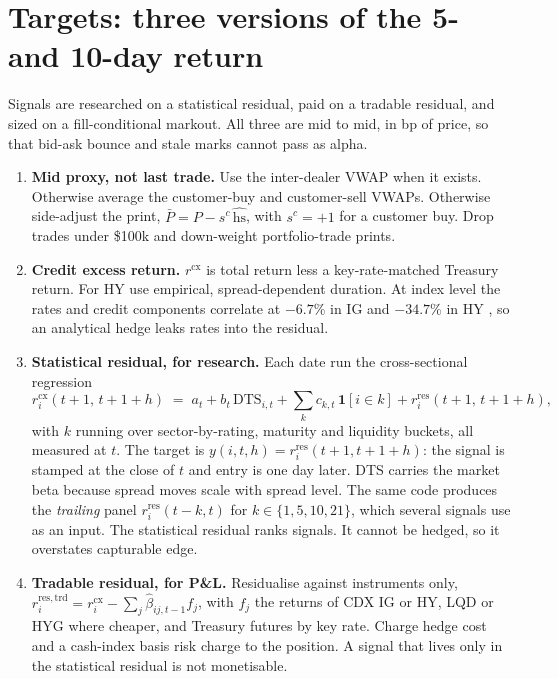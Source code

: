 \documentclass[11pt,letterpaper]{article}
\newcommand{\ind}[1]{\mathbf{1}\!\left[#1\right]}
\newcommand{\Pm}{\bar{P}}                 %
\newcommand{\hs}{\mathrm{hs}}             %
\newcommand{\rres}{r^{\mathrm{res}}}      %
\newcommand{\rcx}{r^{\mathrm{cx}}}        %
\begin{document}
\section{Targets: three versions of the 5- and 10-day return}
\label{sec:targets}

Signals are researched on a statistical residual, paid on a tradable residual, and sized on a fill-conditional markout. All three are mid to mid, in bp of price, so that bid-ask bounce and stale marks cannot pass as alpha.

\begin{enumerate}[itemsep=4pt]
\item \textbf{Mid proxy, not last trade.} Use the inter-dealer VWAP when it exists. Otherwise average the customer-buy and customer-sell VWAPs. Otherwise side-adjust the print, $\Pm = P - s^{c}\,\widehat{\hs}$, with $s^{c}=+1$ for a customer buy. Drop trades under \$100k and down-weight portfolio-trade prints.

\item \textbf{Credit excess return.} $\rcx$ is total return less a key-rate-matched Treasury return. For HY use empirical, spread-dependent duration. At index level the rates and credit components correlate at $-6.7\%$ in IG and $-34.7\%$ in HY \cite{andreani2024}, so an analytical hedge leaks rates into the residual.

\item \textbf{Statistical residual, for research.} Each date run the cross-sectional regression
\begin{equation}
\rcx_i(t+1,\,t+1+h) \;=\; a_t + b_t\,\mathrm{DTS}_{i,t} + \sum_k c_{k,t}\,\ind{i\in k} + \rres_i(t+1,\,t+1+h),
\end{equation}
with $k$ running over sector-by-rating, maturity and liquidity buckets, all measured at $t$. The target is $y(i,t,h)=\rres_i(t+1,t+1+h)$: the signal is stamped at the close of $t$ and entry is one day later. DTS carries the market beta because spread moves scale with spread level. The same code produces the \emph{trailing} panel $\rres_i(t-k,t)$ for $k\in\{1,5,10,21\}$, which several signals use as an input. The statistical residual ranks signals. It cannot be hedged, so it overstates capturable edge.

\item \textbf{Tradable residual, for P\&L.} Residualise against instruments only,
$r^{\mathrm{res,trd}}_i=\rcx_i-\sum_j\hat\beta_{ij,t-1}f_j$, with $f_j$ the returns of CDX IG or HY, LQD or HYG where cheaper, and Treasury futures by key rate. Charge hedge cost and a cash-index basis risk charge to the position. A signal that lives only in the statistical residual is not monetisable.


\end{enumerate}
\end{document}
